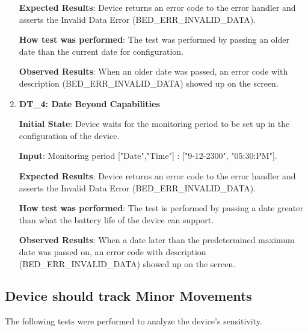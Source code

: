 \documentclass[12pt, titlepage]{article}
\begin{document}
\begin{enumerate}
  \textbf{Expected Results}: Device returns an error code to the error handler and asserts the Invalid Data Error (BED\_ERR\_INVALID\_DATA).

  \textbf{How test was performed}: The test was performed by passing an older date than the current date for configuration.

  \textbf{Observed Results}: When an older date was passed, an error code with description (BED\_ERR\_INVALID\_DATA) showed up on the screen.

  \item{\textbf{DT\_4: Date Beyond Capabilities}\\}\label{DT4}

  \textbf{Initial State}: Device waits for the monitoring period to be set up in the configuration of the device.

  \textbf{Input}: Monitoring period ["Date","Time"] : ["9-12-2300", "05:30:PM"].

  \textbf{Expected Results}: Device returns an error code to the error handler and asserts the Invalid Data Error (BED\_ERR\_INVALID\_DATA).

  \textbf{How test was performed}: The test is performed by passing a date greater than what the battery life of the device can support.

  \textbf{Observed Results}: When a date later than the predetermined maximum date was passed on, an error code with description (BED\_ERR\_INVALID\_DATA) showed up on the screen.
\end{enumerate}

\subsection{Device should track Minor Movements}
The following tests were performed to analyze the device's sensitivity.
\end{document}
